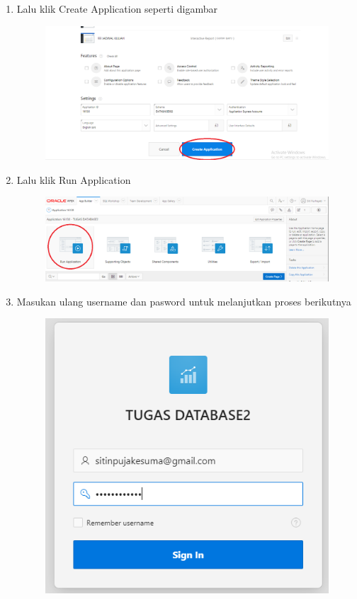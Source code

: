 \begin{enumerate}
	\item Lalu klik Create Application seperti digambar 
	\begin{figure} [!htbp]
	\includegraphics[scale=0.2]{Apex/29.png}
	\centering
	\end{figure}
	
	\item Lalu klik Run Application
	\begin{figure} [!htbp]
	\includegraphics[scale=0.2]{Apex/30.png}
	\centering
	\end{figure}
	
	\item Masukan ulang username dan pasword untuk melanjutkan proses berikutnya  
	\begin{figure} [!htbp]
	\includegraphics[scale=0.2]{Apex/31.png}
	\centering
	\end{figure}
	

\end{enumerate}
